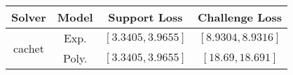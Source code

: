 \begin{tabular}{cc|c|c} 
\hline 
 Solver & Model & Support Loss  & Challenge Loss \tabularnewline\hline 
\hline 
\multirow{2}{*}{cachet} & Exp. & $\mathbf{\left[3.3405,3.9655\right]}$ & $\mathbf{\left[8.9304,8.9316\right]}$ \tabularnewline 
 & Poly. & $\left[3.3405,3.9655\right]$ & $\left[18.69,18.691\right]$ \tabularnewline 
\hline 
\end{tabular} 

